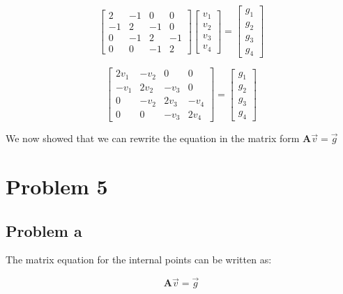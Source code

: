 \documentclass[english,notitlepage]{revtex4-1}  %
\begin{document}
$$
    \begin{bmatrix}
        2  & -1 & 0  & 0  \\
        -1 & 2  & -1 & 0  \\
        0  & -1 & 2  & -1 \\
        0  & 0  & -1 & 2
    \end{bmatrix}
    \begin{bmatrix}
        v_1 \\
        v_2 \\
        v_3 \\
        v_4
    \end{bmatrix} = \begin{bmatrix}
        g_1 \\
        g_2 \\
        g_3 \\
        g_4
    \end{bmatrix}
$$

$$
    \begin{bmatrix}
        2v_1 & -v_2 & 0    & 0    \\
        -v_1 & 2v_2 & -v_3 & 0    \\
        0    & -v_2 & 2v_3 & -v_4 \\
        0    & 0    & -v_3 & 2v_4
    \end{bmatrix} = \begin{bmatrix}
        g_1 \\
        g_2 \\
        g_3 \\
        g_4
    \end{bmatrix}
$$

We now showed that we can rewrite the equation in the matrix form $\mathbf{A} \vec{v} = \vec{g}$

\section*{Problem 5}
\subsection*{Problem a}
The matrix equation for the internal points can be written as:

$$
    \mathbf{A} \vec{v} = \vec{g}
$$
\end{document}
